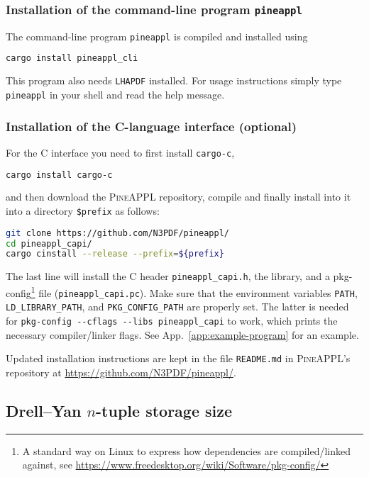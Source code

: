 \subsubsection*{Installation of the command-line program \texorpdfstring{\texttt{pineappl}}{pineappl}}

The command-line program \texttt{pineappl} is compiled and installed using
\begin{lstlisting}[language=bash]
cargo install pineappl_cli
\end{lstlisting}
This program also needs \texttt{LHAPDF} \cite{Buckley:2014ana} installed.
For usage instructions simply type \texttt{pineappl} in your shell and read the help message.

\subsubsection*{Installation of the C-language interface (optional)}

For the C interface you need to first install \texttt{cargo-c},
\begin{lstlisting}[language=bash]
cargo install cargo-c
\end{lstlisting}
and then download the \textsc{PineAPPL} repository, compile and finally install into it into a directory \texttt{\$prefix} as follows:
\begin{lstlisting}[language=bash]
git clone https://github.com/N3PDF/pineappl/
cd pineappl_capi/
cargo cinstall --release --prefix=${prefix}
\end{lstlisting}
The last line will install the C header \texttt{pineappl\_capi.h}, the library, and a pkg-config\footnote{A standard way on Linux to express how dependencies are compiled/linked against, see \url{https://www.freedesktop.org/wiki/Software/pkg-config/}} file (\texttt{pineappl\_capi.pc}).
Make sure that the environment variables \texttt{PATH}, \texttt{LD\_LIBRARY\_PATH}, and \texttt{PKG\_CONFIG\_PATH} are properly set.
The latter is needed for \texttt{pkg-config -{}-cflags -{}-libs pineappl\_capi} to work, which prints the necessary compiler/linker flags.
See App.~\ref{app:example-program} for an example.

Updated installation instructions are kept in the file \texttt{README.md} in \textsc{PineAPPL}'s repository at \url{https://github.com/N3PDF/pineappl/}.

\subsection{Drell--Yan \texorpdfstring{$n$}{n}-tuple storage size}
\label{app:drell-yan-storage}

